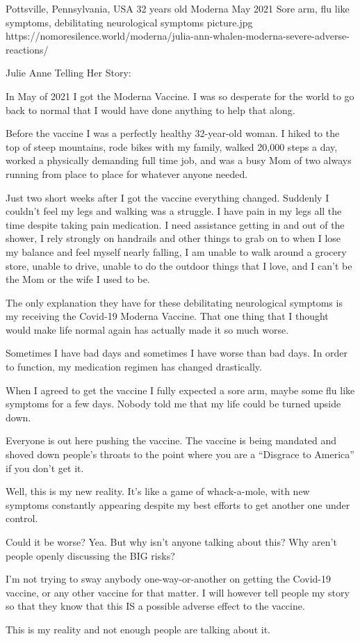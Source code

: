 {Pottsville, Pennsylvania, USA}
{32 years old}
{Moderna}
{May 2021}
{Sore arm, flu like symptoms, debilitating neurological symptoms}
{picture.jpg}
{https://nomoresilence.world/moderna/julia-ann-whalen-moderna-severe-adverse-reactions/}
{

Julie Anne Telling Her Story:

In May of 2021 I got the Moderna Vaccine. I was so desperate for the world to go
back to normal that I would have done anything to help that along.

Before the vaccine I was a perfectly healthy 32-year-old woman. I hiked to the
top of steep mountains, rode bikes with my family, walked 20,000 steps a day,
worked a physically demanding full time job, and was a busy Mom of two always
running from place to place for whatever anyone needed.

Just two short weeks after I got the vaccine everything changed. Suddenly I
couldn’t feel my legs and walking was a struggle. I have pain in my legs all the
time despite taking pain medication. I need assistance getting in and out of the
shower, I rely strongly on handrails and other things to grab on to when I lose
my balance and feel myself nearly falling, I am unable to walk around a grocery
store, unable to drive, unable to do the outdoor things that I love, and I can’t
be the Mom or the wife I used to be.

The only explanation they have for these debilitating neurological symptoms is
my receiving the Covid-19 Moderna Vaccine. That one thing that I thought would
make life normal again has actually made it so much worse.

Sometimes I have bad days and sometimes I have worse than bad days. In order to
function, my medication regimen has changed drastically.

When I agreed to get the vaccine I fully expected a sore arm, maybe some flu
like symptoms for a few days. Nobody told me that my life could be turned upside
down.

Everyone is out here pushing the vaccine. The vaccine is being mandated and
shoved down people’s throats to the point where you are a “Disgrace to America”
if you don’t get it.

Well, this is my new reality. It’s like a game of whack-a-mole, with new
symptoms constantly appearing despite my best efforts to get another one under
control.

Could it be worse? Yea. But why isn’t anyone talking about this? Why aren’t
people openly discussing the BIG risks?

I’m not trying to sway anybody one-way-or-another on getting the Covid-19
vaccine, or any other vaccine for that matter. I will however tell people my
story so that they know that this IS a possible adverse effect to the vaccine.

This is my reality and not enough people are talking about it.

}

